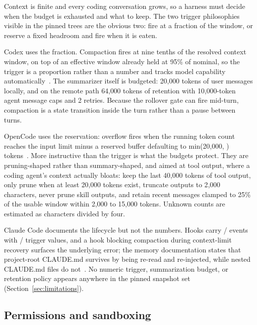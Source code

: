 \documentclass{article}
\newcommand{\codex}[0]{Codex}
\newcommand{\occ}[0]{OpenCode}
\newcommand{\ccc}[0]{Claude Code}
\begin{document}
Context is finite and every coding conversation grows, so a harness must
decide when the budget is exhausted and what to keep. The two trigger
philosophies visible in the pinned trees are the obvious two: fire at a
fraction of the window, or reserve a fixed headroom and fire when it is
eaten.

\codex{} uses the fraction. Compaction fires at nine tenths of the
resolved context window, on top of an effective window already held at
95\% of nominal, so the trigger is a proportion rather than a number and
tracks model capability automatically~\citep{codexRepo}. The summarizer
itself is budgeted: 20{,}000 tokens of user messages locally, and on the
remote path 64{,}000 tokens of retention with 10{,}000-token agent
message caps and 2 retries. Because the rollover gate can fire mid-turn,
compaction is a state transition inside the turn rather than a pause
between turns.

\occ{} uses the reservation: overflow fires when the running token count
reaches the input limit minus a reserved buffer defaulting to
min(20{,}000, )
tokens~\citep{opencodeRepo}. More instructive than the trigger is what
the budgets protect. They are pruning-shaped rather than summary-shaped,
and aimed at tool output, where a coding agent's context actually bloats:
keep the last 40{,}000 tokens of tool output, only prune when at least
20{,}000 tokens exist, truncate outputs to 2{,}000 characters, never prune
skill outputs, and retain recent messages clamped to 25\% of the usable
window within 2{,}000 to 15{,}000 tokens. Unknown counts are estimated
as characters divided by four.

\ccc{} documents the lifecycle but not the numbers. Hooks carry
/ events with /
trigger values, and a hook blocking compaction during context-limit
recovery surfaces the underlying error; the memory documentation states
that project-root CLAUDE.md survives  by being re-read and
re-injected, while nested CLAUDE.md files do
not~\citep{claudeCodeHooksDocs,claudeCodeMemoryDocs}. No numeric trigger,
summarization budget, or retention policy appears anywhere in the pinned
snapshot set (Section~\ref{sec:limitations}).

\subsection{Permissions and sandboxing}
\label{sec:safety}
\end{document}
